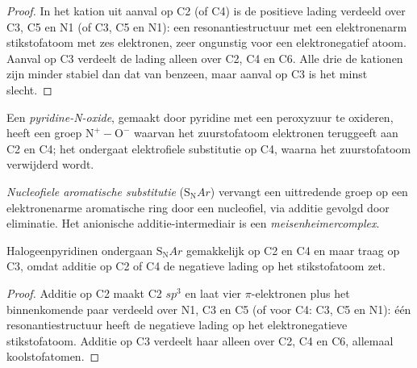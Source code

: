 \begin{proof}
In het kation uit aanval op C2 (of C4) is de positieve lading verdeeld
over C3, C5 en N1 (of C3, C5 en N1): een resonantiestructuur met een
elektronenarm stikstofatoom met zes elektronen, zeer ongunstig voor een
elektronegatief atoom. Aanval op C3 verdeelt de lading alleen over C2, C4
en C6. Alle drie de kationen zijn minder stabiel dan dat van benzeen,
maar aanval op C3 is het minst slecht.
\end{proof}

\begin{definition}\label{def:b3:heterocycles:n-oxide}
Een \emph{pyridine-N-oxide}, gemaakt door pyridine
met een peroxyzuur te oxideren, heeft een groep $\mathrm{N^+{-}O^-}$ waarvan het zuurstofatoom elektronen teruggeeft aan C2
en C4; het ondergaat elektrofiele substitutie op C4, waarna het
zuurstofatoom verwijderd wordt.
\end{definition}

\begin{definition}\label{def:b3:heterocycles:snar}
\emph{Nucleofiele aromatische substitutie}
($\mathrm S_\mathrm NAr$) vervangt een uittredende groep op een elektronenarme aromatische ring
door een nucleofiel, via additie gevolgd door eliminatie. Het anionische
additie-intermediair is een
\emph{meisenheimercomplex}.
\end{definition}

\begin{proposition}\label{prop:b3:heterocycles:snar-positions}
Halogeenpyridinen ondergaan $\mathrm S_\mathrm NAr$ gemakkelijk op C2 en C4 en maar traag op C3,
omdat additie op C2 of C4 de negatieve lading op het stikstofatoom zet.
\end{proposition}

\begin{proof}
Additie op C2 maakt C2 $sp^3$ en laat vier $\pi$-elektronen plus het binnenkomende paar
verdeeld over N1, C3 en C5 (of voor C4: C3, C5 en N1): één resonantiestructuur
heeft de negatieve lading op het elektronegatieve stikstofatoom. Additie
op C3 verdeelt haar alleen over C2, C4 en C6, allemaal koolstofatomen.
\end{proof}

